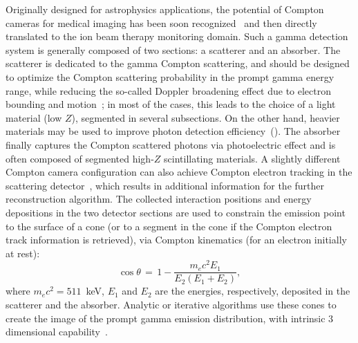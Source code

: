 Originally designed for astrophysics applications, the potential of Compton cameras for medical imaging has been soon recognized~\cite{TODD:1974aa} and then directly translated to the ion beam therapy monitoring domain. Such a gamma detection system is generally  composed of two sections: a scatterer and an absorber. The scatterer is dedicated to the gamma Compton scattering, and should be designed to optimize the Compton scattering probability in the prompt gamma energy range, while reducing the so-called Doppler broadening effect due to electron bounding and motion~\cite{Doppler}; in most of the cases, this leads to the choice of a light material (low $Z$), segmented in several subsections. On the other hand, heavier materials may be used to improve photon detection efficiency~(\cite{Solevi:2016aa, ALDAWOOD2017190, 0031-9155-60-18-7085}). The absorber finally captures the Compton scattered photons via photoelectric effect and is often composed of segmented high-$Z$ scintillating materials. A slightly different Compton camera configuration can also achieve Compton electron tracking in the scattering detector~\cite{Frandes_2010, Yoshihara_ETCC}, which results in additional information for the further reconstruction algorithm.
 The collected interaction positions and energy depositions in the two detector sections are used to constrain the emission point to the surface of a cone (or to a segment in the cone if the Compton electron track information is retrieved), via Compton kinematics (for an electron initially at rest):
\begin{equation}
\cos\theta\,=\,1-\frac{m_{e}c^{2}E_{1}}{E_{2}(E_{1}+E_{2})},
\label{Compton_equation}
\end{equation} 
where \(m_{e}c^{2} = 511\)~keV, \(E_{1}\) and \(E_{2}\) are the energies, respectively, deposited in the scatterer and the absorber. 
Analytic or iterative algorithms use these cones to create the image of the prompt gamma emission distribution, with intrinsic 3 dimensional capability~\cite{McKisson3D, Kuchment:2016uiw}. 


